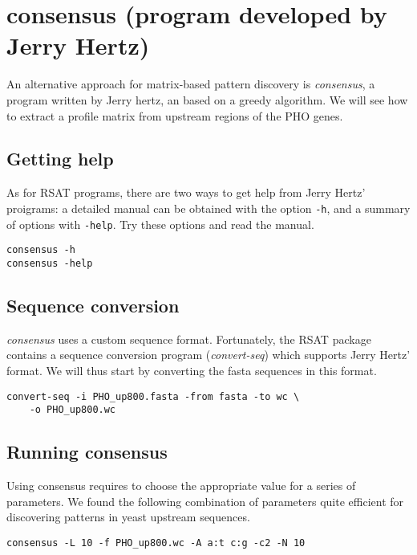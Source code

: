 \section{consensus (program developed by Jerry Hertz)}

An alternative approach for matrix-based pattern discovery is
\textit{consensus}, a program written by Jerry hertz, an based on a
greedy algorithm. We will see how to extract a profile matrix from
upstream regions of the PHO genes.

\subsection{Getting help}

As for RSAT programs, there are two ways to get help from Jerry Hertz'
proigrams: a detailed manual can be obtained with the option
\texttt{-h}, and a summary of options with \texttt{-help}. Try these
options and read the manual.

\begin{verbatim}
consensus -h
consensus -help
\end{verbatim}

\subsection{Sequence conversion}


\textit{consensus} uses a custom sequence format. Fortunately, the RSAT
package contains a sequence conversion program (\textit{convert-seq})
which supports Jerry Hertz' format. We will thus start by converting
the fasta sequences in this format. 

\begin{verbatim}
convert-seq -i PHO_up800.fasta -from fasta -to wc \ 
    -o PHO_up800.wc
\end{verbatim}

\subsection{Running consensus}

Using consensus requires to choose the appropriate value for a series
of parameters. We found the following combination of parameters quite
efficient for discovering patterns in yeast upstream sequences.

\begin{verbatim}
consensus -L 10 -f PHO_up800.wc -A a:t c:g -c2 -N 10
\end{verbatim}


